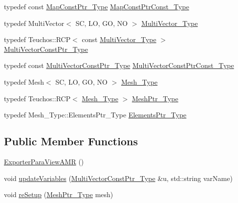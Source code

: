 \begin{DoxyCompactItemize}
\item 
typedef const \hyperlink{classFEDD_1_1ExporterParaViewAMR_a0b62499b70ea553b391b3436b292a84b}{Map\+Const\+Ptr\+\_\+\+Type} \hyperlink{classFEDD_1_1ExporterParaViewAMR_afb5f7cf35a4a4f028bda4ed0e8ac348c}{Map\+Const\+Ptr\+Const\+\_\+\+Type}
\item 
typedef Multi\+Vector$<$ SC, LO, GO, NO $>$ \hyperlink{classFEDD_1_1ExporterParaViewAMR_a644ed3c9ba0ffabd9f1f5ebfbe8cef37}{Multi\+Vector\+\_\+\+Type}
\item 
typedef Teuchos\+::\+R\+CP$<$ const \hyperlink{classFEDD_1_1ExporterParaViewAMR_a644ed3c9ba0ffabd9f1f5ebfbe8cef37}{Multi\+Vector\+\_\+\+Type} $>$ \hyperlink{classFEDD_1_1ExporterParaViewAMR_a6be568ff4943f421566c689db311cdd3}{Multi\+Vector\+Const\+Ptr\+\_\+\+Type}
\item 
typedef const \hyperlink{classFEDD_1_1ExporterParaViewAMR_a6be568ff4943f421566c689db311cdd3}{Multi\+Vector\+Const\+Ptr\+\_\+\+Type} \hyperlink{classFEDD_1_1ExporterParaViewAMR_a8cde0bbf33cda8c311ffebf847823717}{Multi\+Vector\+Const\+Ptr\+Const\+\_\+\+Type}
\item 
typedef Mesh$<$ SC, LO, GO, NO $>$ \hyperlink{classFEDD_1_1ExporterParaViewAMR_a78bd1d686f0a39bec2918939789bfe70}{Mesh\+\_\+\+Type}
\item 
typedef Teuchos\+::\+R\+CP$<$ \hyperlink{classFEDD_1_1ExporterParaViewAMR_a78bd1d686f0a39bec2918939789bfe70}{Mesh\+\_\+\+Type} $>$ \hyperlink{classFEDD_1_1ExporterParaViewAMR_abdb6338dbd32c5ac33078c866e03bdae}{Mesh\+Ptr\+\_\+\+Type}
\item 
typedef Mesh\+\_\+\+Type\+::\+Elements\+Ptr\+\_\+\+Type \hyperlink{classFEDD_1_1ExporterParaViewAMR_a9056e87edd95835c1c4bd81e14aaaf28}{Elements\+Ptr\+\_\+\+Type}
\end{DoxyCompactItemize}
\subsection*{Public Member Functions}
\begin{DoxyCompactItemize}
\item 
\hyperlink{classFEDD_1_1ExporterParaViewAMR_aef1563dbd4a39229e953528d096f46f7}{Exporter\+Para\+View\+A\+MR} ()
\item 
void \hyperlink{classFEDD_1_1ExporterParaViewAMR_a491f740253489d8496666fc8bb2cb248}{update\+Variables} (\hyperlink{classFEDD_1_1ExporterParaViewAMR_a6be568ff4943f421566c689db311cdd3}{Multi\+Vector\+Const\+Ptr\+\_\+\+Type} \&u, std\+::string var\+Name)
\item 
void \hyperlink{classFEDD_1_1ExporterParaViewAMR_af09a245685a0f2b4e7c7972edce4043d}{re\+Setup} (\hyperlink{classFEDD_1_1ExporterParaViewAMR_abdb6338dbd32c5ac33078c866e03bdae}{Mesh\+Ptr\+\_\+\+Type} mesh)
\end{DoxyCompactItemize}


